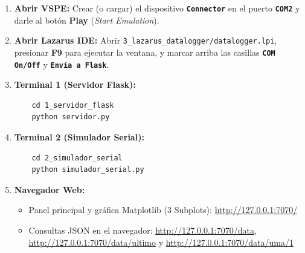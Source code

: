 \documentclass[11pt,a4paper]{article}
\begin{document}
\begin{enumerate}[leftmargin=1.5em]
    \item \textbf{Abrir VSPE:} Crear (o cargar) el dispositivo \textbf{\texttt{Connector}} en el puerto \textbf{\texttt{COM2}} y darle al botón \textbf{Play} (\emph{Start Emulation}).
    \item \textbf{Abrir Lazarus IDE:} Abrir \texttt{3\_lazarus\_datalogger/datalogger.lpi}, presionar \textbf{F9} para ejecutar la ventana, y marcar arriba las casillas \textbf{\texttt{COM On/Off}} y \textbf{\texttt{Envía a Flask}}.
    \item \textbf{Terminal 1 (Servidor Flask):}
    \begin{verbatim}
    cd 1_servidor_flask
    python servidor.py
    \end{verbatim}
    \item \textbf{Terminal 2 (Simulador Serial):}
    \begin{verbatim}
    cd 2_simulador_serial
    python simulador_serial.py
    \end{verbatim}
    \item \textbf{Navegador Web:}
    \begin{itemize}
        \item Panel principal y gráfica Matplotlib (3 Subplots): \url{http://127.0.0.1:7070/}
        \item Consultas JSON en el navegador: \url{http://127.0.0.1:7070/data}, \url{http://127.0.0.1:7070/data/ultimo} y \url{http://127.0.0.1:7070/data/uma/1}
    \end{itemize}
\end{enumerate}
\end{document}
